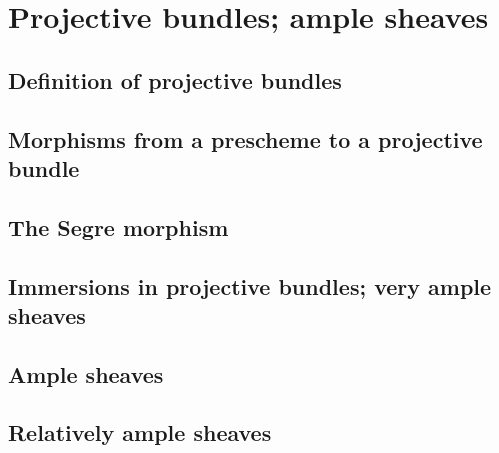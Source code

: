 \section{Projective bundles; ample sheaves}
\label{section:2.4}


\subsection{Definition of projective bundles}
\label{subsection:2.4.1}


\subsection{Morphisms from a prescheme to a projective bundle}
\label{subsection:2.4.2}


\subsection{The Segre morphism}
\label{subsection:2.4.3}


\subsection{Immersions in projective bundles; very ample sheaves}
\label{subsection:2.4.4}


\subsection{Ample sheaves}
\label{subsection:2.4.5}


\subsection{Relatively ample sheaves}
\label{subsection:2.4.6}

